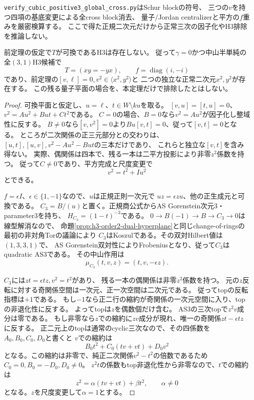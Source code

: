 \texttt{verify\_cubic\_positive3\_global\_cross.py}はSchur blockの符号、
三つの$v$を持つ四項の基底変更による全cross block消去、
量子/Jordan centralizerと平方の$f$重みを厳密検算する。
ここで得た正規二次元だけから正常三次の因子化やH3排除を推論しない。

\begin{theorem}[正三次元半単純側の可換共通平面は排除される]
\label{thm:h3-positive3-commutative-plane-exclusion}
前定理の仮定で$T$が可換であるH3は存在しない。
従って$\gamma=0$かつ中山半単純の全$(3,1)$H3候補で
\[
 T=(xy=-yx),\qquad f=\operatorname{diag}(i,-i)
\]
であり、前定理の$[v,\ell]=0,v^2\in\langle x^2,y^2\rangle$と
二つの独立な正常二次元$x^2,y^2$が存在する。
この残る量子平面の場合を、本定理だけで排除したとはしない。
\end{theorem}
\begin{proof}
可換平面と仮定し、$u=\ell$、$t\in W\setminus ku$を取る。
$[v,u]=[t,u]=0$、$v^2=A u^2+B ut+C t^2$である。
$C=0$の場合、$B=0$なら$v^2=A u^2$が因子化し整域性に反する。
$B\ne0$なら$[v,v^2]=0$より$Bu[v,t]=0$、従って$[v,t]=0$となる。
ところが二次関係の正三元部分との交わりは、
$[u,t],[u,v],v^2-Au^2-But$の三本だけであり、
これらと独立な$[v,t]$を含み得ない。
実際、偶関係は四本で、残る一本は二平方投影により非零$z^2$係数を持つ。
従って$C\ne0$であり、平方完成と尺度変更で
\[
 v^2=t^2+Iu^2
\]
とできる。

$f=\epsilon I$、$\epsilon\in\{1,-1\}$なので、$u$は正規正則一次元で
$uz=\epsilon zu$、他の正生成元と可換である。
$C_3=B/(u)$と置く。正規商公式からAS Gorenstein次元3・parameter3を持ち、
$H_{C_3}=(1-t)^{-3}$である。
$0\to B(-1)\to B\to C_3\to0$は線型解消なので、
命題\ref{prop:h3-order2-dual-hyperplane}と同じchange-of-ringsの最初の非対角Torの議論により
$C_3$はKoszulである。その双対Hilbert値は$(1,3,3,1)$で、
AS Gorenstein双対性によりFrobeniusとなり、従って$C_3$はquadratic AS3である。
その中山作用は
\[
 \mu_{C_3}(t,v,z)=(t,v,-\epsilon z).
\]

$C_3$には$zt=\epsilon tz,v^2=t^2$があり、
残る一本の偶関係は非零$z^2$係数を持つ。
元の$z$反転に対する奇関係空間は一次元、正一次空間は二次元である。
従ってtopの反転指標は$+1$である。
もし$-1$なら正二行の縮約が奇関係の一次元空間に入り、topの非退化性に反する。
よってtopは$z$を偶数個だけ含む。
AS3の三次topで$z^2v$成分は零である。
もし非零なら$z$での縮約に$zv$成分が現れ、唯一の奇関係$zt-\epsilon tz$に反する。
正二元上のtopは通常のcyclic三次なので、その四係数を$A_0,B_0,C_0,D_0$と書くと
$v$での縮約は
\[
 B_0t^2+C_0(tv+vt)+D_0v^2
\]
となる。この縮約は非零で、純正二次関係$v^2-t^2$の倍数であるため
$C_0=0,B_0=-D_0,D_0\ne0$。
$z^2t$の係数もtop非退化性から非零なので、$t$での縮約は
\[
 z^2=\alpha(tv+vt)+\beta t^2,\qquad\alpha\ne0
\]
となる。$z$を尺度変更して$\alpha=1$とする。


\end{proof}
